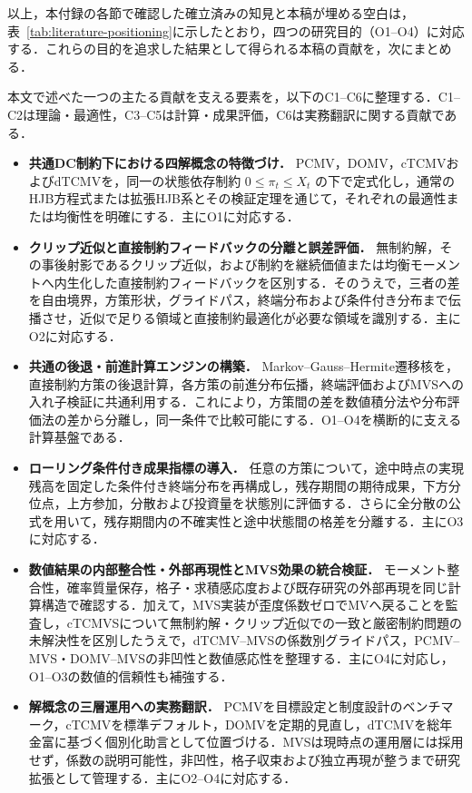 \documentclass[10pt,a4paper]{article}
\theoremstyle{plain}
\theoremstyle{definition}
\begin{document}
以上，本付録の各節で確認した確立済みの知見と本稿が埋める空白は，表~\ref{tab:literature-positioning}に示したとおり，四つの研究目的（O1--O4）に対応する．これらの目的を追求した結果として得られる本稿の貢献を，次にまとめる．

本文で述べた一つの主たる貢献を支える要素を，以下のC1--C6に整理する．C1--C2は理論・最適性，C3--C5は計算・成果評価，C6は実務翻訳に関する貢献である．

\begin{itemize}[leftmargin=16mm,itemsep=4pt,topsep=4pt]
  \item[\textbf{C1}] \textbf{共通DC制約下における四解概念の特徴づけ．}
  PCMV，DOMV，cTCMVおよびdTCMVを，同一の状態依存制約 $0\leq\pi_t\leq X_t$ の下で定式化し，通常のHJB方程式または拡張HJB系とその検証定理を通じて，それぞれの最適性または均衡性を明確にする．主にO1に対応する．

  \item[\textbf{C2}] \textbf{クリップ近似と直接制約フィードバックの分離と誤差評価．}
  無制約解，その事後射影であるクリップ近似，および制約を継続価値または均衡モーメントへ内生化した直接制約フィードバックを区別する．そのうえで，三者の差を自由境界，方策形状，グライドパス，終端分布および条件付き分布まで伝播させ，近似で足りる領域と直接制約最適化が必要な領域を識別する．主にO2に対応する．

  \item[\textbf{C3}] \textbf{共通の後退・前進計算エンジンの構築．}
  Markov--Gauss--Hermite遷移核を，直接制約方策の後退計算，各方策の前進分布伝播，終端評価およびMVSへの入れ子検証に共通利用する．これにより，方策間の差を数値積分法や分布評価法の差から分離し，同一条件で比較可能にする．O1--O4を横断的に支える計算基盤である．

  \item[\textbf{C4}] \textbf{ローリング条件付き成果指標の導入．}
  任意の方策について，途中時点の実現残高を固定した条件付き終端分布を再構成し，残存期間の期待成果，下方分位点，上方参加，分散および投資量を状態別に評価する．さらに全分散の公式を用いて，残存期間内の不確実性と途中状態間の格差を分離する．主にO3に対応する．

  \item[\textbf{C5}] \textbf{数値結果の内部整合性・外部再現性とMVS効果の統合検証．}
  モーメント整合性，確率質量保存，格子・求積感応度および既存研究の外部再現を同じ計算構造で確認する．加えて，MVS実装が歪度係数ゼロでMVへ戻ることを監査し，cTCMVSについて無制約解・クリップ近似での一致と厳密制約問題の未解決性を区別したうえで，dTCMV--MVSの係数別グライドパス，PCMV--MVS・DOMV--MVSの非凹性と数値感応性を整理する．主にO4に対応し，O1--O3の数値的信頼性も補強する．

  \item[\textbf{C6}] \textbf{解概念の三層運用への実務翻訳．}
  PCMVを目標設定と制度設計のベンチマーク，cTCMVを標準デフォルト，DOMVを定期的見直し，dTCMVを総年金富に基づく個別化助言として位置づける．MVSは現時点の運用層には採用せず，係数の説明可能性，非凹性，格子収束および独立再現が整うまで研究拡張として管理する．主にO2--O4に対応する．
\end{itemize}
\end{document}
